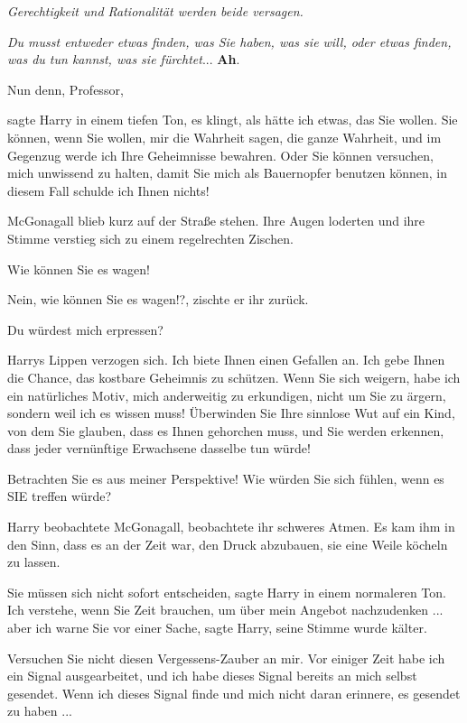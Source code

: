 \emph{Gerechtigkeit und Rationalität werden beide versagen.}

\emph{Du musst entweder etwas finden, was Sie haben, was sie will, oder etwas
finden, was du tun kannst, was sie fürchtet}... \textbf{Ah}.

\glqq{}Nun denn, Professor\grqq{},

sagte Harry in einem tiefen Ton, \glqq{}es klingt, als hätte ich etwas, das Sie
wollen. Sie können, wenn Sie wollen, mir die Wahrheit sagen, die ganze Wahrheit,
und im Gegenzug werde ich Ihre Geheimnisse bewahren. Oder Sie können versuchen,
mich unwissend zu halten, damit Sie mich als Bauernopfer benutzen können, in
diesem Fall schulde ich Ihnen nichts!\grqq{}

McGonagall blieb kurz auf der Straße stehen. Ihre Augen loderten und ihre Stimme
verstieg sich zu einem regelrechten Zischen.

\glqq{}Wie können Sie es wagen!\grqq{}

\glqq{}Nein, wie können Sie es wagen!?\grqq{}, zischte er ihr zurück.

\glqq{}Du würdest mich erpressen?\grqq{}

Harrys Lippen verzogen sich. \glqq{}Ich biete Ihnen einen Gefallen an. Ich gebe
Ihnen die Chance, das kostbare Geheimnis zu schützen. Wenn Sie sich weigern,
habe ich ein natürliches Motiv, mich anderweitig zu erkundigen, nicht um Sie zu
ärgern, sondern weil ich es wissen muss! Überwinden Sie Ihre sinnlose Wut auf
ein Kind, von dem Sie glauben, dass es Ihnen gehorchen muss, und Sie werden
erkennen, dass jeder vernünftige Erwachsene dasselbe tun würde!

Betrachten Sie es aus meiner Perspektive! Wie würden Sie sich fühlen, wenn es
SIE treffen würde?\grqq{}

Harry beobachtete McGonagall, beobachtete ihr schweres Atmen. Es kam ihm in den
Sinn, dass es an der Zeit war, den Druck abzubauen, sie eine Weile köcheln zu
lassen.

\glqq{}Sie müssen sich nicht sofort entscheiden\grqq{}, sagte Harry in einem
normaleren Ton. \glqq{}Ich verstehe, wenn Sie Zeit brauchen, um über mein
Angebot nachzudenken ... aber ich warne Sie vor einer Sache\grqq{}, sagte Harry,
seine Stimme wurde kälter.

\glqq{}Versuchen Sie nicht diesen Vergessens-Zauber an mir. Vor einiger Zeit
habe ich ein Signal ausgearbeitet, und ich habe dieses Signal bereits an mich
selbst gesendet. Wenn ich dieses Signal finde und mich nicht daran erinnere, es
gesendet zu haben ...\grqq{}

